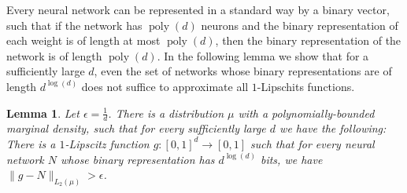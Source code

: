 \documentclass[11pt]{article}
\newtheorem{lemma}{Lemma}[section]
\DeclareMathOperator{\poly}{poly}
\newcommand{\snorm}[1]{\|#1\|} %
\begin{document}
Every neural network can be represented in a standard way by a binary vector, such that if the network has $\poly(d)$ neurons and the binary representation of each weight is of length at most $\poly(d)$, then the binary representation of the network is of length $\poly(d)$. In the following lemma we show that for a sufficiently large $d$, even the set of networks whose binary representations are of length $d^{\log(d)}$ does not suffice to approximate all $1$-Lipschits functions.

\begin{lemma}
\label{lemma:1 lipschits}
	Let $\epsilon = \frac{1}{d}$. There is a distribution $\mu$ with a polynomially-bounded marginal density, such that for every sufficiently large $d$ we have the following: There is a $1$-Lipscitz function $g:[0,1]^d \rightarrow [0,1]$ such that for every neural network $N$ whose binary representation has $d^{\log(d)}$ bits, we have $\snorm{g-N}_{L_2(\mu)} > \epsilon$.
\end{lemma}
\end{document}
